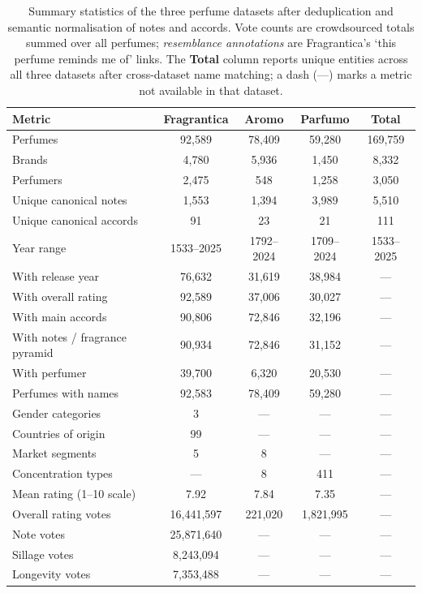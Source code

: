 \begin{table}[ht]
\centering
\small
\caption{Summary statistics of the three perfume datasets after deduplication and semantic normalisation of notes and accords. Vote counts are crowdsourced totals summed over all perfumes; \emph{resemblance annotations} are Fragrantica's `this perfume reminds me of' links. The \textbf{Total} column reports unique entities across all three datasets after cross-dataset name matching; a dash (---) marks a metric not available in that dataset.}
\label{tab:dataset_comparison}
\begin{tabular}{lcccc}
\toprule
\textbf{Metric} & \textbf{Fragrantica} & \textbf{Aromo} & \textbf{Parfumo} & \textbf{Total} \\
\midrule
Perfumes & 92,589 & 78,409 & 59,280 & 169,759 \\
Brands & 4,780 & 5,936 & 1,450 & 8,332 \\
Perfumers & 2,475 & 548 & 1,258 & 3,050 \\
Unique canonical notes & 1,553 & 1,394 & 3,989 & 5,510 \\
Unique canonical accords & 91 & 23 & 21 & 111 \\
Year range & 1533--2025 & 1792--2024 & 1709--2024 & 1533--2025 \\
With release year & 76,632 & 31,619 & 38,984 & --- \\
With overall rating & 92,589 & 37,006 & 30,027 & --- \\
With main accords & 90,806 & 72,846 & 32,196 & --- \\
With notes / fragrance pyramid & 90,934 & 72,846 & 31,152 & --- \\
With perfumer & 39,700 & 6,320 & 20,530 & --- \\
Perfumes with names & 92,583 & 78,409 & 59,280 & --- \\
Gender categories & 3 & --- & --- & --- \\
Countries of origin & 99 & --- & --- & --- \\
Market segments & 5 & 8 & --- & --- \\
Concentration types & --- & 8 & 411 & --- \\
Mean rating (1--10 scale) & 7.92 & 7.84 & 7.35 & --- \\
Overall rating votes & 16,441,597 & 221,020 & 1,821,995 & --- \\
Note votes & 25,871,640 & --- & --- & --- \\
Sillage votes & 8,243,094 & --- & --- & --- \\
Longevity votes & 7,353,488 & --- & --- & --- \\

\end{tabular}
\end{table}
